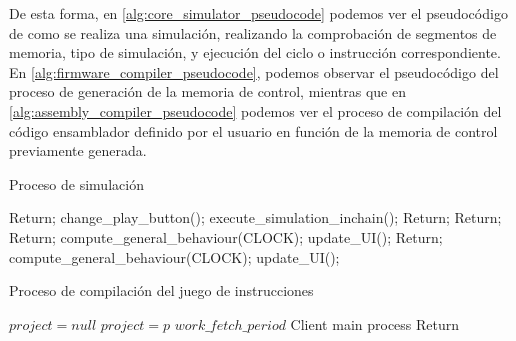 De esta forma, en \ref{alg:core_simulator_pseudocode} podemos ver el pseudocódigo de como se realiza una simulación, realizando la comprobación de segmentos de memoria, tipo de simulación, y ejecución del ciclo o instrucción correspondiente. En \ref{alg:firmware_compiler_pseudocode}, podemos observar el pseudocódigo del proceso de generación de la memoria de control, mientras que en \ref{alg:assembly_compiler_pseudocode} podemos ver el proceso de compilación del código ensamblador definido por el usuario en función de la memoria de control previamente generada.

\vspace{1cm}

\begin{algorithm}[h]
	\caption{Proceso de simulación}
	\label{alg:core_simulator_pseudocode}
  	\scriptsize
	\begin{algorithmic}[1]
		    \State Return;
		  \EndIf		
		  \State change\_play\_button();
		  \State execute\_simulation\_inchain();
		\EndFunction
		    \State Return;
		   \EndIf	
		    \State Return;
		   \EndIf	
		   \EndIf
		   \EndIf	
		\EndFunction
		    \State Return;
		\EndIf
		\State compute\_general\_behaviour(CLOCK); 
		\State update\_UI();		
		\EndFunction
		    \State Return;
		\EndIf
		\Do
		\State compute\_general\_behaviour(CLOCK); 
		 
		\State update\_UI(); 
		\EndFunction
	\end{algorithmic}
\end{algorithm}

\clearpage

\begin{algorithm}[h]
	\caption{Proceso de compilación del juego de instrucciones}
	\label{alg:firmware_compiler_pseudocode}
  	\scriptsize
	\begin{algorithmic}[1]
		\State $project = null$
		\State $project = p$
		\EndIf
		\EndFor
		\State {}
		\EndIf		
		\State {} $work\_fetch\_period$
		\EndWhile	
		\State {} Client main process
		\State Return
		\EndFunction
	\end{algorithmic}
\end{algorithm}

